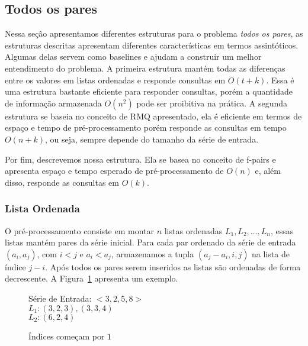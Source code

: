 \documentclass[12pt]{article}
\begin{document}
\subsection{Todos os pares}

Nessa seção apresentamos diferentes estruturas
para o problema \textit{todos os pares}, as estruturas descritas apresentam diferentes
características em termos assintóticos. Algumas delas
servem como baselines e ajudam a construir um melhor entendimento do problema.
A primeira estrutura mantém todas as diferenças entre os valores 
em listas ordenadas e responde consultas em $O(t + k)$. 
Essa é uma estrutura bastante eficiente para responder consultas,
porém a quantidade de informação armazenada $O(n^2)$ pode ser 
proibitiva na prática. A segunda estrutura se baseia no conceito de RMQ apresentado,
ela é eficiente em termos de espaço e tempo de pré-processamento
porém responde as consultas em tempo $O(n + k)$, ou seja,
sempre depende do tamanho da série de entrada. 

Por fim, descrevemos nossa estrutura. Ela se basea
no conceito de f-pairs e apresenta espaço e tempo esperado de 
pré-processamento de $O(n)$ e, além disso, responde as consultas em $O(k)$.


\subsubsection{Lista Ordenada}

O pré-processamento consiste em montar $n$ listas ordenadas $L_1, L_2, \ldots, L_n$, 
essas listas mantém pares da série inicial. Para cada par ordenado da série de entrada $(a_i, a_j)$, com $i < j$ e $a_i < a_j$,
armazenamos a tupla $(a_j - a_i, i, j)$ na lista de índice $j - i$.
Após todos os pares serem inseridos as listas são ordenadas de forma decrescente. A Figura~\ref{fig:exemplolista} apresenta um exemplo.

\clearpage
\begin{center}
\begin{figure}
\begin{framed}
Série de Entrada: $<3, 2, 5, 8>$ \\
$L_1: (3, 2, 3), (3, 3, 4)$ \\
$L_2: (6, 2, 4)$ \\
\caption{Índices começam por $1$}
\label{fig:exemplolista}
\end{framed}
\end{figure}
\end{center}
\end{document}
